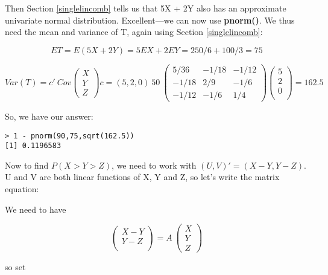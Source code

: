 Then Section \ref{singlelincomb} tells us that 5X + 2Y also has an
approximate univariate normal distribution.  Excellent---we can now use
{\bf pnorm()}.  We thus need the mean and variance of T, again using
Section \ref{singlelincomb}:

\begin{equation}
ET = E(5X+2Y) = 5 EX + 2 EY = 250/6 + 100/3 = 75
\end{equation}

\begin{equation}
Var(T) =
c' ~ Cov
\left (
\begin{array}{c}
X \\
Y \\
Z 
\end{array}
\right )
c
=
(5,2,0) ~
50 ~
\left (
\begin{array}{rrr}
5/36 & -1/18 & -1/12 \\
-1/18 & 2/9 & -1/6 \\
-1/12 & -1/6 & 1/4 
\end{array}
\right )
\left (
\begin{array}{r}
5 \\
2 \\
0 \\
\end{array}
\right )
= 162.5
\end{equation}

So, we have our answer:

\begin{lstlisting}
> 1 - pnorm(90,75,sqrt(162.5))
[1] 0.1196583
\end{lstlisting}

Now to find $P(X > Y > Z)$, we need to work with $(U,V)' = (X-Y,Y-Z)$. 
U and V are both linear functions of X, Y and Z, so let's write the
matrix equation:

We need to have

\begin{equation}
\left (
\begin{array}{r}
X-Y \\
Y-Z \\
\end{array}
\right )
=
A ~
\left (
\begin{array}{c}
X \\
Y \\
Z 
\end{array}
\right )
\end{equation}

so set

